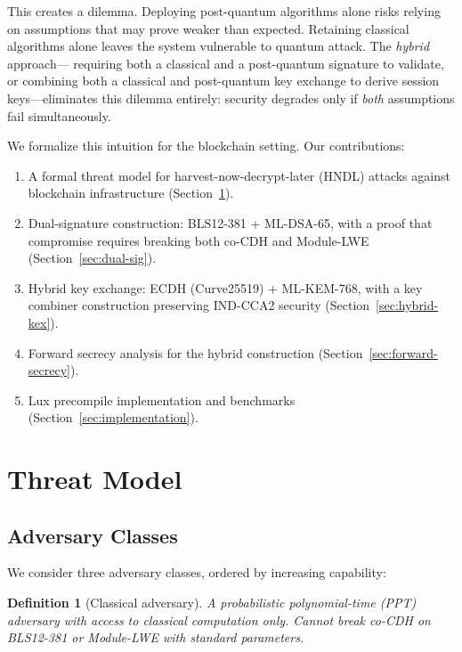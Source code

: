 \documentclass[11pt,a4paper]{article}
\newtheorem{definition}{Definition}[section]
\begin{document}
This creates a dilemma. Deploying post-quantum algorithms alone risks relying on
assumptions that may prove weaker than expected. Retaining classical algorithms
alone leaves the system vulnerable to quantum attack. The \emph{hybrid} approach---
requiring both a classical and a post-quantum signature to validate, or combining
both a classical and post-quantum key exchange to derive session keys---eliminates
this dilemma entirely: security degrades only if \emph{both} assumptions fail
simultaneously.

We formalize this intuition for the blockchain setting. Our contributions:

\begin{enumerate}[leftmargin=2em]
  \item A formal threat model for harvest-now-decrypt-later (HNDL) attacks against
        blockchain infrastructure (Section~\ref{sec:threat-model}).
  \item Dual-signature construction: BLS12-381 + ML-DSA-65, with a proof that
        compromise requires breaking both co-CDH and Module-LWE
        (Section~\ref{sec:dual-sig}).
  \item Hybrid key exchange: ECDH (Curve25519) + ML-KEM-768, with a key combiner
        construction preserving IND-CCA2 security
        (Section~\ref{sec:hybrid-kex}).
  \item Forward secrecy analysis for the hybrid construction
        (Section~\ref{sec:forward-secrecy}).
  \item Lux precompile implementation and benchmarks
        (Section~\ref{sec:implementation}).
\end{enumerate}

\section{Threat Model}
\label{sec:threat-model}

\subsection{Adversary Classes}

We consider three adversary classes, ordered by increasing capability:

\begin{definition}[Classical adversary]
\label{def:classical}
A probabilistic polynomial-time (PPT) adversary with access to classical computation
only. Cannot break co-CDH on BLS12-381 or Module-LWE with standard parameters.
\end{definition}
\end{document}
